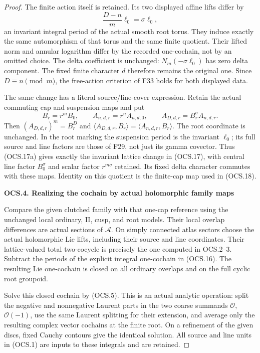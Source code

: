 \begin{proof}
The finite action itself is retained. Its two displayed affine
lifts differ by
\[
 \frac{D-n}{m}\ell_0=\sigma\ell_0,
\tag{OCS.17}
\]
an invariant integral period of the actual smooth root torus.
They induce exactly the same automorphism of that torus and the
same finite quotient. Their lifted norm and annular logarithm
differ by the recorded one-cochain, not by an omitted choice.
The delta coefficient is unchanged: \(N_m(-\sigma\ell_0)\)
has zero delta component. The fixed finite character \(d\)
therefore remains the original one. Since \(D\equiv n\pmod m\),
the free-action criterion of F33 holds for both displayed data.

The same change has a literal source/line-cover expression. Retain
the actual commuting cap and suspension maps and put
\[
 B_r=r^mB_0,\qquad A_{n,d,r}=r^nA_{n,d,0},\qquad
 A_{D,d,r}=B_r^\sigma A_{n,d,r}.
\tag{OCS.17a}
\]
Then \((A_{D,d,r})^m=B_r^D\) and
\(\langle A_{D,d,r},B_r\rangle=\langle A_{n,d,r},B_r\rangle\).
The root coordinate is unchanged. In the root marking the
suspension period is the invariant \(\ell_0\); its full source
and line factors are those of F29, not just its gamma covector.
Thus (OCS.17a) gives exactly the invariant lattice change in
(OCS.17), with central line factor \(B_0^\sigma\) and scalar
factor \(r^{m\sigma}\) retained. Its fixed delta character
commutes with these maps. Identity on this quotient is the
finite-cap map used in (OCS.18).

\par

\medskip\noindent\textbf{OCS.4. Realizing the cochain by actual holomorphic family maps}

\par\nobreak

Compare the given clutched family with that one-cap reference
using the unchanged local ordinary, II, cusp, and root models.
Their local overlap differences are actual sections of
\(\mathcal A\). On simply connected atlas sectors choose the
actual holomorphic Lie lifts, including their source and line
coordinates. Their lattice-valued total two-cocycle is precisely
the one computed in OCS.2--3. Subtract the periods of the explicit
integral one-cochain in (OCS.16). The resulting Lie one-cochain
is closed on all ordinary overlaps and on the full cyclic
root groupoid.

Solve this closed cochain by (OCS.5). This is an actual analytic
operation: split the negative and nonnegative Laurent parts in
the two coarse summands \(\mathcal O\), \(\mathcal O(-1)\),
use the same Laurent splitting for their extension, and average
only the resulting complex vector cochains at the finite root.
On a refinement of the given discs, fixed Cauchy contours give
the identical solution. All source and line units in (OCS.1)
are inputs to these integrals and are retained.


\end{proof}
